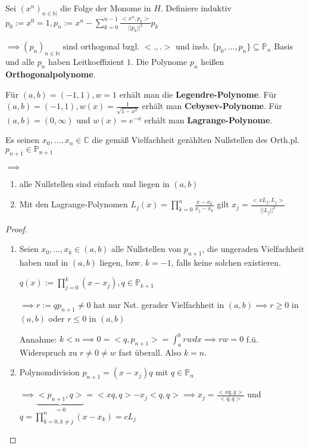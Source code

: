 \begin{lemma}
	Sei $(x^n)_{n \in \mathbb{N}}$ die Folge der Monome in $H$. Definiere induktiv $p_0 := x^0 = 1, p_n := x^n - \sum_{k=0}^{n-1} \frac{<x^n, p_k>}{||p_k||^2} p_k$
	
	$\implies (p_n)_{n\in \mathbb{N}}$ sind orthogonal bzgl. $<., .>$ und insb. $\{p_0, ..., p_n\} \subseteq \mathbb{P}_n$ Basis und alle $p_n$ haben Leitkoeffizient $1$. Die Polynome $p_n$ heißen \textbf{Orthogonalpolynome}.
\end{lemma}

\begin{remark}
	Für $(a,b) = (-1, 1), w=1$ erhält man die \textbf{Legendre-Polynome}. Für $(a,b)=(-1, 1), w(x)=\frac{1}{\sqrt{1-x^2}}$ erhält man \textbf{Cebysev-Polynome}. Für $(a,b)=(0, \infty)$ und $w(x)=e^{-x}$ erhält man \textbf{Lagrange-Polynome}.
\end{remark}

\begin{lemma}
	Es seinen $x_0, ..., x_n \in \mathbb{C}$ die gemäß Vielfachheit gezählten Nullstellen des Orth.pl. $p_{n+1} \in \mathbb{P}_{n+1}$
	
	$\implies$
	\begin{enumerate}
		\item alle Nullstellen sind einfach und liegen in $(a,b)$
		\item Mit den Lagrange-Polynomen $L_j(x) = \prod_{k=0}^{n} \frac{x-x_k}{x_j - x_k}$ gilt $x_j = \frac{<xL_j, L_j>}{||L_j||^2}$
	\end{enumerate}
\end{lemma}

\begin{proof}
	\begin{enumerate}
		\item Seien $x_0, ..., x_k \in (a,b)$ alle Nullstellen von $p_{n+1}$, die ungeraden Vielfachheit haben und in $(a,b)$ liegen, bzw. $k=-1$, falls keine solchen existieren.
		
		$q(x) := \prod_{j=0}^{k} (x-x_j), q \in \mathbb{P}_{k+1}$
		
		$\implies r := q p_{n+1} \neq 0$ hat nur Nst. gerader Vielfachheit in $(a,b) \implies r \geq 0$ in $(a,b)$ oder $r \leq 0$ in $(a,b)$
		
		Annahme: $k < n \implies 0 = <q, p_{n+1}> = \int_{a}^{b} rw dx \implies rw = 0$ f.ü. Widerspruch zu $r \neq 0 \neq w$ fast überall. Also $k=n$.
		
		\item Polynomdivision $p_{n+1} = (x-x_j)q$ mit $q \in \mathbb{P}_n$
		
		$\implies \underbrace{<p_{n+1}, q>}_{=0} = <xq,q> - x_j <q,q> \implies x_j = \frac{<xq,q>}{<q,q>}$ und $q = \prod_{k=0, k\neq j}^{n} (x-x_k) = cL_j$
	\end{enumerate}
\end{proof}

